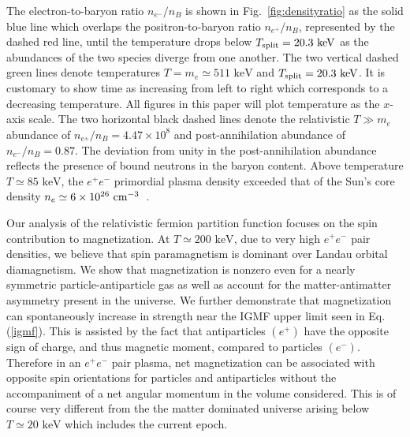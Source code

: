 \documentclass[a4paper]{article}
\newcommand*{\keV}{\text{ keV}}
\newcommand{\req}[1]{Eq.\,(\ref{#1})}
\newcommand{\rf}[1]{Fig.~{\ref{#1}}}
\newcommand*{\xblue}{\color{black}}
\begin{document}
{\xblue The electron-to-baryon ratio $n_{e^{-}}/n_{B}$ is shown in \rf{fig:densityratio} as the solid blue line which overlaps the positron-to-baryon ratio $n_{e^{+}}/n_{B}$, represented by the dashed red line, until the temperature drops below $T_{\rm split}=20.3\keV$ as the abundances of the two species diverge from one another.} The two vertical dashed green lines denote temperatures $T=m_{e}\simeq511\keV$ and $T_{\rm split}=20.3\keV$. {\xblue It is customary to show time as increasing from left to right which corresponds to a decreasing temperature. All figures in this paper will plot temperature as the $x$-axis scale.} The two horizontal black dashed lines denote the relativistic $T\gg m_e$ abundance of $n_{e^{\pm}}/n_{B}=4.47\times10^{8}$ and post-annihilation {\xblue abundance of  $n_{e^{-}}/n_{B}=0.87$. The deviation from unity in the post-annihilation abundance reflects the presence of bound neutrons in the baryon content.} Above temperature $T\simeq85\keV$, the $e^{+}e^{-}$ primordial plasma density exceeded that of the Sun's core density $n_{e}\simeq6\times10^{26}{\rm\ cm}^{-3}$~\cite{bahcall2001solar}. 

{\xblue Our analysis of the relativistic fermion partition function focuses} on the spin contribution to magnetization. {\xblue At $T\simeq200\keV$, due to very high $e^{+}e^{-}$ pair densities, we believe that spin paramagnetism is dominant over Landau orbital diamagnetism.} We show that magnetization is nonzero {\xblue even for a nearly symmetric particle-antiparticle gas as well as account for the matter-antimatter asymmetry present in the universe.} We further demonstrate that magnetization can spontaneously increase in strength near the IGMF upper limit seen in \req{igmf}. This is assisted by the fact that antiparticles $(e^{+})$ have the opposite sign of charge, and thus magnetic moment, compared to particles  $(e^{-})$. {\xblue Therefore in an $e^{+}e^{-}$ pair plasma, net magnetization can be associated with opposite spin orientations for particles and antiparticles without the accompaniment of} a net angular momentum in the volume considered. This is of course very different from the the matter dominated universe arising below $T\simeq20\keV$ which includes the current epoch.

\end{document}
